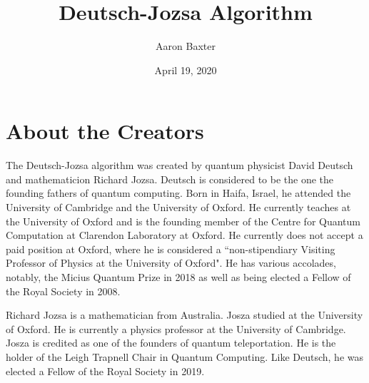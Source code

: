 \documentclass[12pt]{article}
\theoremstyle{definition}
\begin{document}
\title{Deutsch-Jozsa Algorithm}

\author{Aaron Baxter}
\date{April 19, 2020}

\maketitle
\section{About the Creators}
The Deutsch-Jozsa algorithm was created by quantum physicist David Deutsch and mathematicion Richard Jozsa. Deutsch is considered to be the one the founding fathers of quantum computing. Born in Haifa, Israel, he attended the University of Cambridge and the University of Oxford. He currently teaches at the University of Oxford and is the founding member of the Centre for Quantum Computation at Clarendon Laboratory at Oxford. He currently does not accept a paid position at Oxford, where he is considered a ``non-stipendiary Visiting Professor of Physics at the University of Oxford". He has various accolades, notably, the Micius Quantum Prize in 2018 as well as being elected a Fellow of the Royal Society in 2008.
 \vspace{.2 in}
 
 
 \noindent Richard Jozsa is a mathematician from Australia. Josza studied at the University of Oxford. He is currently a physics professor at the University of Cambridge. Josza is credited as one of the founders of quantum teleportation. He is the holder of the Leigh Trapnell Chair in Quantum Computing. Like Deutsch, he was elected a Fellow of the Royal Society in 2019. 
 
\end{document}
